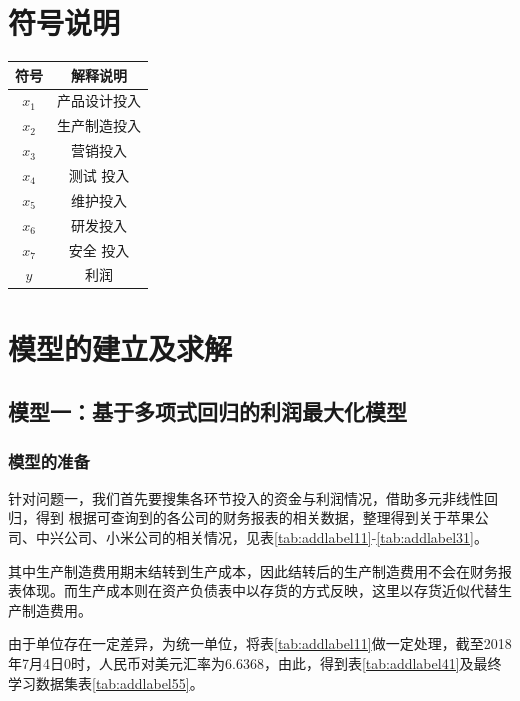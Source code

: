 \documentclass[12pt]{article}%
\begin{document}
\section{符号说明}
\begin{table}[htbp]
  \centering
    \begin{tabular}{cc}
    \hline
    符号 & 解释说明 \\
      \hline
   $ x_1$ & 产品设计投入 \\
    $x_2$ & 生产制造投入 \\
    $x_3$ & 营销投入 \\
    $x_4$ & 测试 投入\\
    $x_5$ & 维护投入 \\
    $x_6 $& 研发投入 \\
    $x_7 $& 安全 投入\\
    $y $ & 利润 \\
         \hline
    \end{tabular}%
  \label{tab:addlabel}%
\end{table}%
\section{模型的建立及求解}
\subsection{模型一：基于多项式回归的利润最大化模型}
\subsubsection{模型的准备}
针对问题一，我们首先要搜集各环节投入的资金与利润情况，借助多元非线性回归，得到
根据可查询到的各公司的财务报表的相关数据，整理得到关于苹果公司\cite{pingguo}、中兴公司\cite{zhongxing}、小米公司\cite{xiaomi}的相关情况，见表\ref{tab:addlabel11}-\ref{tab:addlabel31}。

其中生产制造费用期末结转到生产成本，因此结转后的生产制造费用不会在财务报表体现。而生产成本则在资产负债表中以存货的方式反映，这里以存货近似代替生产制造费用。

由于单位存在一定差异，为统一单位，将表\ref{tab:addlabel11}做一定处理，截至2018年7月4日0时，人民币对美元汇率为6.6368，由此，得到表\ref{tab:addlabel41}及最终学习数据集表\ref{tab:addlabel55}。
\end{document}
